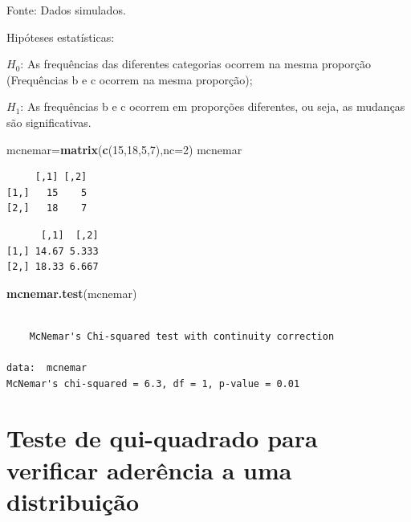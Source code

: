 \documentclass[12pt,brazil,oneside]{book}
\newenvironment{Shaded}{\begin{snugshade}}{\end{snugshade}}
\newcommand{\DataTypeTok}[1]{\textcolor[rgb]{0.13,0.29,0.53}{#1}}
\newcommand{\DecValTok}[1]{\textcolor[rgb]{0.00,0.00,0.81}{#1}}
\newcommand{\KeywordTok}[1]{\textcolor[rgb]{0.13,0.29,0.53}{\textbf{#1}}}
\newcommand{\NormalTok}[1]{#1}
\newcommand{\OperatorTok}[1]{\textcolor[rgb]{0.81,0.36,0.00}{\textbf{#1}}}
\begin{document}
Fonte: Dados simulados.

Hipóteses estatísticas:

\(H_0\): As frequências das diferentes categorias ocorrem na mesma proporção (Frequências b e c ocorrem na mesma proporção);

\(H_1\): As frequências b e c ocorrem em proporções diferentes, ou seja, as mudanças são significativas.

\begin{Shaded}
\begin{Highlighting}[]
\NormalTok{mcnemar=}\KeywordTok{matrix}\NormalTok{(}\KeywordTok{c}\NormalTok{(}\DecValTok{15}\NormalTok{,}\DecValTok{18}\NormalTok{,}\DecValTok{5}\NormalTok{,}\DecValTok{7}\NormalTok{),}\DataTypeTok{nc=}\DecValTok{2}\NormalTok{)}
\NormalTok{mcnemar}
\end{Highlighting}
\end{Shaded}

\begin{verbatim}
     [,1] [,2]
[1,]   15    5
[2,]   18    7
\end{verbatim}

\begin{Shaded}
\end{Shaded}

\begin{verbatim}
      [,1]  [,2]
[1,] 14.67 5.333
[2,] 18.33 6.667
\end{verbatim}

\begin{Shaded}
\begin{Highlighting}[]
\KeywordTok{mcnemar.test}\NormalTok{(mcnemar)}
\end{Highlighting}
\end{Shaded}

\begin{verbatim}

    McNemar's Chi-squared test with continuity correction

data:  mcnemar
McNemar's chi-squared = 6.3, df = 1, p-value = 0.01
\end{verbatim}

\hypertarget{teste-de-qui-quadrado-para-verificar-aderencia-a-uma-distribuicao}{%
\section{Teste de qui-quadrado para verificar aderência a uma distribuição}\label{teste-de-qui-quadrado-para-verificar-aderencia-a-uma-distribuicao}}
\end{document}
